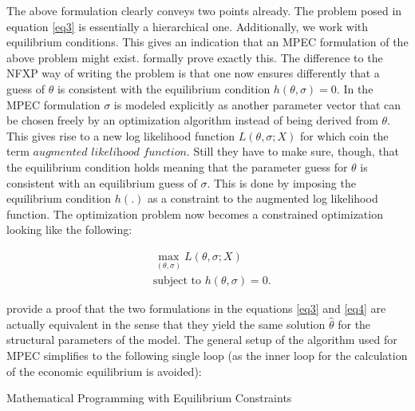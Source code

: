 The above formulation clearly conveys two points already. The problem posed in equation \ref{eq3} is essentially a hierarchical one. Additionally, we work with equilibrium conditions. This gives an indication that an MPEC formulation of the above problem might exist. \cite{Su.Judd.2012} formally prove exactly this. The difference to the NFXP way of writing the problem is that one now ensures differently that a guess of $\theta$ is consistent with the equilibrium condition $h(\theta, \sigma)=0$. In the MPEC formulation $\sigma$ is modeled explicitly as another parameter vector that can be chosen freely by an optimization algorithm instead of being derived from $\theta$. This gives rise to a new log likelihood function $L(\theta, \sigma; X)$ for which \citeauthor{Su.Judd.2012} coin the term $\textit{augmented likelihood function}$. Still they have to make sure, though, that the equilibrium condition holds meaning that the parameter guess for $\theta$ is consistent with an equilibrium guess of $\sigma$. This is done by imposing the equilibrium condition $h(.)$ as a constraint to the augmented log likelihood function. The optimization problem now becomes a constrained optimization looking like the following:

\begin{equation}
	\begin{aligned}
		& \max_{(\theta, \sigma)} L(\theta, \sigma; X) \\
		& \text{subject to } h(\theta, \sigma) = 0.
	\end{aligned}
	\label{eq4}
\end{equation}

\cite{Su.Judd.2012} provide a proof that the two formulations in the equations \ref{eq3} and \ref{eq4} are actually equivalent in the sense that they yield the same solution $\hat\theta$ for the structural parameters of the model. The general setup of the algorithm used for MPEC simplifies to the following single loop (as the inner loop for the calculation of the economic equilibrium is avoided):

\vspace{2ex}
\begin{algorithm}[H]
	\SetAlgoLined
	\caption{Mathematical Programming with Equilibrium Constraints}
\end{algorithm}
\vspace{2ex}

